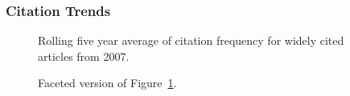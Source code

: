 \documentclass[
  10pt,
  letterpaper,
  DIV=11,
  numbers=noendperiod,
  twoside]{scrartcl}
\begin{document}
\subsubsection*{Citation Trends}\label{sec-trends-2007}

\begin{figure}


\caption{\label{fig-citation-spaghetti-2007}Rolling five year average of
citation frequency for widely cited articles from 2007.}

\end{figure}%

\begin{figure}


\caption{\label{fig-citation-facet-2007}Faceted version of
Figure~\ref{fig-citation-spaghetti-2007}.}

\end{figure}%
\end{document}
